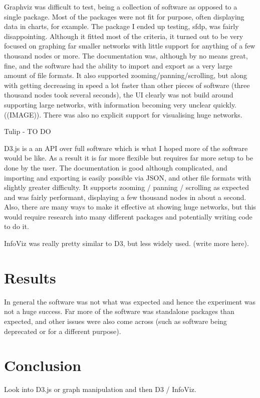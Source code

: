 Graphviz was difficult to test, being a collection of software as opposed to a single package. Most of the packages were not fit for purpose, often displaying data in charts, for example. The package I ended up testing, sfdp, was fairly disappointing. Although it fitted most of the criteria, it turned out to be very focused on graphing far smaller networks with little support for anything of a few thousand nodes or more. The documentation was, although by no means great, fine, and the software had the ability to import and export as a very large amount of file formats. It also supported zooming/panning/scrolling, but along with getting decreasing in speed a lot faster than other pieces of software (three thousand nodes took several seconds), the UI clearly was not build around supporting large networks, with information becoming very unclear quickly.  ((IMAGE)). There was also no explicit support for visualising huge networks.

Tulip - TO DO

D3.js is a an API over full software which is what I hoped more of the software would be like. As a result it is far more flexible but requires far more setup to be done by the user. The documentation is good although complicated, and importing and exporting is easily possible via JSON, and other file formats with slightly greater difficulty. It supports zooming / panning / scrolling as expected and was fairly performant, displaying a few thousand nodes in about a second. Also, there are many ways to make it effective at showing huge networks, but this would require research into many different packages and potentially writing code to do it.

InfoViz was really pretty similar to D3, but less widely used. (write more here).


\section{Results}
In general the software was not what was expected and hence the experiment was not a huge success. Far more of the software was standalone packages than expected, and other issues were also come across (such as software being deprecated or for a different purpose). 

\section{Conclusion}

Look into D3.js or graph manipulation and then D3 / InfoViz.

